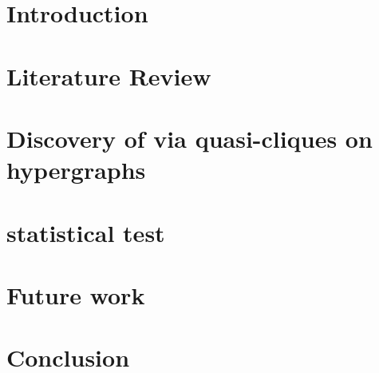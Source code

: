 \documentclass[12pt]{book}
\begin{document}
\mainmatter

\chapter{Introduction}
\label{chapter:introduction}


\chapter{Literature Review}
\label{chapter:literature_review}


\chapter{Discovery of  via quasi-cliques on hypergraphs}
\label{chapter:edd}


\chapter{ statistical test}
\label{chapter:som}


\chapter{Future work}
\label{chapter:future_work}


\chapter{Conclusion}
\label{chapter:conclusions}


\printbibliography[heading=bibintoc]

\backmatter

\begin{refsection}
\nocite{Alvarez2019,Alvarez2021inference}

\printbibliography[heading=bibintoc,title={List of Publications}]
\end{refsection}
\end{document}
